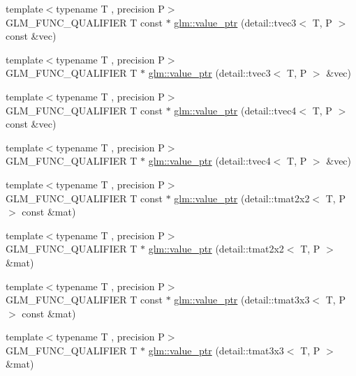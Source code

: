 \begin{DoxyCompactItemize}
{\footnotesize template$<$typename T , precision P$>$ }\\G\-L\-M\-\_\-\-F\-U\-N\-C\-\_\-\-Q\-U\-A\-L\-I\-F\-I\-E\-R T const $\ast$ \hyperlink{group__gtc__type__ptr_ga676a0ba6f4b7cd817fe6d16cb3113857}{glm\-::value\-\_\-ptr} (detail\-::tvec3$<$ T, P $>$ const \&vec)
\item 
{\footnotesize template$<$typename T , precision P$>$ }\\G\-L\-M\-\_\-\-F\-U\-N\-C\-\_\-\-Q\-U\-A\-L\-I\-F\-I\-E\-R T $\ast$ \hyperlink{group__gtc__type__ptr_ga4babc9956e32bbd0769bc20ab2d73800}{glm\-::value\-\_\-ptr} (detail\-::tvec3$<$ T, P $>$ \&vec)
\item 
{\footnotesize template$<$typename T , precision P$>$ }\\G\-L\-M\-\_\-\-F\-U\-N\-C\-\_\-\-Q\-U\-A\-L\-I\-F\-I\-E\-R T const $\ast$ \hyperlink{group__gtc__type__ptr_ga6963deec2c77b8a49b3f7e434914f6ba}{glm\-::value\-\_\-ptr} (detail\-::tvec4$<$ T, P $>$ const \&vec)
\item 
{\footnotesize template$<$typename T , precision P$>$ }\\G\-L\-M\-\_\-\-F\-U\-N\-C\-\_\-\-Q\-U\-A\-L\-I\-F\-I\-E\-R T $\ast$ \hyperlink{group__gtc__type__ptr_gaa3ed69a05293987972b589311e5feb23}{glm\-::value\-\_\-ptr} (detail\-::tvec4$<$ T, P $>$ \&vec)
\item 
{\footnotesize template$<$typename T , precision P$>$ }\\G\-L\-M\-\_\-\-F\-U\-N\-C\-\_\-\-Q\-U\-A\-L\-I\-F\-I\-E\-R T const $\ast$ \hyperlink{group__gtc__type__ptr_ga013fcf415d78cc3aa9273c5d4f780325}{glm\-::value\-\_\-ptr} (detail\-::tmat2x2$<$ T, P $>$ const \&mat)
\item 
{\footnotesize template$<$typename T , precision P$>$ }\\G\-L\-M\-\_\-\-F\-U\-N\-C\-\_\-\-Q\-U\-A\-L\-I\-F\-I\-E\-R T $\ast$ \hyperlink{group__gtc__type__ptr_ga11e5b6c0d7d5d2627df624bb4b219f20}{glm\-::value\-\_\-ptr} (detail\-::tmat2x2$<$ T, P $>$ \&mat)
\item 
{\footnotesize template$<$typename T , precision P$>$ }\\G\-L\-M\-\_\-\-F\-U\-N\-C\-\_\-\-Q\-U\-A\-L\-I\-F\-I\-E\-R T const $\ast$ \hyperlink{group__gtc__type__ptr_ga78acb1fd15ce7d1d2861493fac9693ec}{glm\-::value\-\_\-ptr} (detail\-::tmat3x3$<$ T, P $>$ const \&mat)
\item 
{\footnotesize template$<$typename T , precision P$>$ }\\G\-L\-M\-\_\-\-F\-U\-N\-C\-\_\-\-Q\-U\-A\-L\-I\-F\-I\-E\-R T $\ast$ \hyperlink{group__gtc__type__ptr_gaad64150511d5c6a2d2c7afec724e4064}{glm\-::value\-\_\-ptr} (detail\-::tmat3x3$<$ T, P $>$ \&mat)

\end{DoxyCompactItemize}

